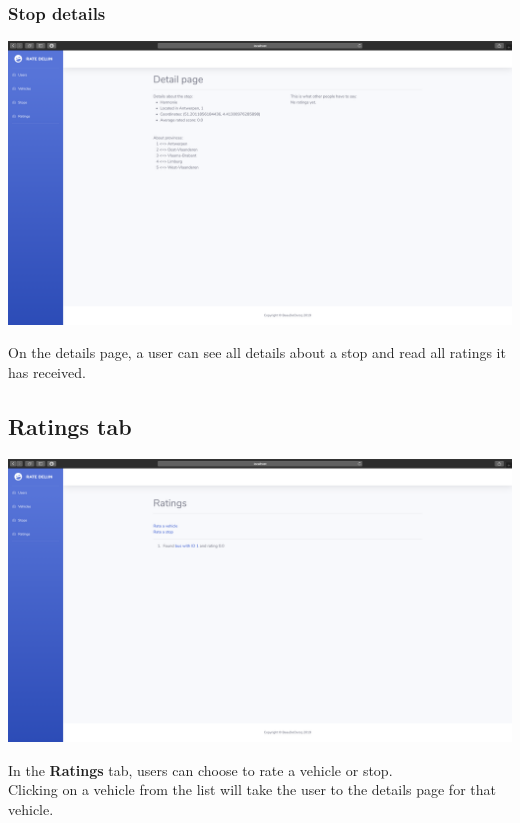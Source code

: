 \documentclass[12pt]{article}
\begin{document}
\subsubsection{Stop details}
\begin{center}
	\includegraphics[width=\linewidth]{Images/Stop_details.png}
\end{center}
On the details page, a user can see all details about a stop and read all ratings it has received.

\subsection{Ratings tab}
\begin{center}
	\includegraphics[width=\linewidth]{Images/Ratings_tab.png}
\end{center}
In the \textbf{Ratings} tab, users can choose to rate a vehicle or stop.\\
Clicking on a vehicle from the list will take the user to the details page for that vehicle.
\end{document}
